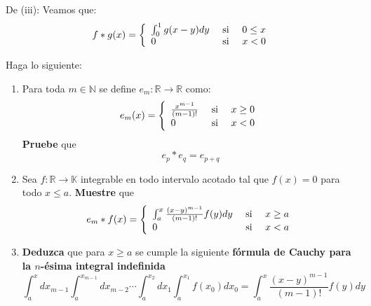 \documentclass[12pt]{report}
\newcounter{it}
\theoremstyle{largebreak}
\newcommand\cf[3]{\ensuremath{#1:#2\rightarrow#3}}
\begin{document}
\begin{sol}
        De (iii): Veamos que:
        \begin{equation*}
            f*g(x)=\left\{
                \begin{array}{lcr}
                    \int_0^1g(x-y)dy & \textup{ si } & 0\leq x \\
                    0 & \textup{ si } & x<0\\ 
                \end{array}
            \right.
        \end{equation*}
    \end{sol}
    
    \begin{excer}
        Haga lo siguiente:
        \begin{enumerate}
            \item Para toda $m\in\mathbb{N}$ se define $\cf{e_m}{\mathbb{R}}{\mathbb{R}}$ como:
            \begin{equation*}
                e_m(x)=\left\{
                    \begin{array}{lcr}
                        \frac{x^{m-1}}{(m-1)!} & \textup{ si } & x\geq 0 \\
                        0 & \textup{ si }&x<0\\
                    \end{array}
                \right.
            \end{equation*}
            \textbf{Pruebe} que
            \begin{equation*}
                e_p*e_q=e_{p+q}
            \end{equation*}
            \item Sea $\cf{f}{\mathbb{R}}{\mathbb{K}}$ integrable en todo intervalo acotado tal que $f(x)=0$ para todo $x\leq a$. \textbf{Muestre} que
            \begin{equation*}
                e_m*f(x)=\left\{
                    \begin{array}{lcr}
                        \int_{a}^x\frac{(x-y)^{m-1}}{(m-1)!}f(y)dy & \textup{ si } & x\geq a \\
                        0 & \textup{ si }&x<a\\
                    \end{array}
                \right.
            \end{equation*}
            \item \textbf{Deduzca} que para $x\geq a$ se cumple la siguiente \textbf{fórmula de Cauchy para la $n$-ésima integral indefinida}
            \begin{equation*}
                \int_{a}^xdx_{ m-1}\int_a^{ x_{m-1}}dx_{m-2}\cdots\int_{a}^{x_{2}} dx_{1}\int_a^{ x_1}f(x_0)dx_0=\int_a^x\frac{(x-y)^{m-1}}{(m-1)!}f(y)dy
            \end{equation*}
        \end{enumerate}
    \end{excer}
\end{document}
